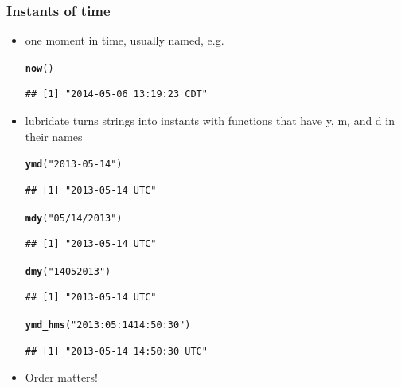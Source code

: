 \documentclass{beamer}\usepackage[]{graphicx}\usepackage[]{color}
\makeatletter
\newcommand{\hlstr}[1]{\textcolor[rgb]{0.192,0.494,0.8}{#1}}%
\newcommand{\hlstd}[1]{\textcolor[rgb]{0.345,0.345,0.345}{#1}}%
\newcommand{\hlkwd}[1]{\textcolor[rgb]{0.737,0.353,0.396}{\textbf{#1}}}%
\newenvironment{kframe}{%
 \def\at@end@of@kframe{}%
 \ifinner\ifhmode%
  \def\at@end@of@kframe{\end{minipage}}%
  \begin{minipage}{\columnwidth}%
 \fi\fi%
 \def\FrameCommand##1{\hskip\@totalleftmargin \hskip-\fboxsep
 \colorbox{shadecolor}{##1}\hskip-\fboxsep
     \hskip-\linewidth \hskip-\@totalleftmargin \hskip\columnwidth}%
 \MakeFramed {\advance\hsize-\width
   \@totalleftmargin\z@ \linewidth\hsize
   \@setminipage}}%
 {\par\unskip\endMakeFramed%
 \at@end@of@kframe}
\newenvironment{knitrout}{}{} %
\makeatother
\begin{document}
\begin{frame}[fragile]
\frametitle{Instants of time}
\begin{itemize}
\item one moment in time, usually named, e.g. 
\begin{knitrout}\footnotesize
{}\color{fgcolor}\begin{kframe}
\begin{alltt}
\hlkwd{now}\hlstd{()}
\end{alltt}
\begin{verbatim}
## [1] "2014-05-06 13:19:23 CDT"
\end{verbatim}
\end{kframe}
\end{knitrout}

\item lubridate turns strings into instants with functions that have y, m, and d in their names
\begin{knitrout}\footnotesize
{}\color{fgcolor}\begin{kframe}
\begin{alltt}
\hlkwd{ymd}\hlstd{(}\hlstr{"2013-05-14"}\hlstd{)}
\end{alltt}
\begin{verbatim}
## [1] "2013-05-14 UTC"
\end{verbatim}
\begin{alltt}
\hlkwd{mdy}\hlstd{(}\hlstr{"05/14/2013"}\hlstd{)}
\end{alltt}
\begin{verbatim}
## [1] "2013-05-14 UTC"
\end{verbatim}
\begin{alltt}
\hlkwd{dmy}\hlstd{(}\hlstr{"14052013"}\hlstd{)}
\end{alltt}
\begin{verbatim}
## [1] "2013-05-14 UTC"
\end{verbatim}
\begin{alltt}
\hlkwd{ymd_hms}\hlstd{(}\hlstr{"2013:05:14 14:50:30"}\hlstd{)}
\end{alltt}
\begin{verbatim}
## [1] "2013-05-14 14:50:30 UTC"
\end{verbatim}
\end{kframe}
\end{knitrout}

\item Order matters!
\end{itemize}
\end{frame}
\end{document}

